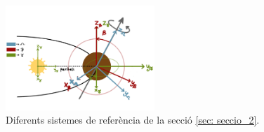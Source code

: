 \documentclass[11pt]{article}
\begin{document}
\begin{figure}[hbt]
    \centering
    \includegraphics[width=0.5\textwidth]{sist_ref.PNG}
    \caption{Diferents sistemes de referència de la secció \ref{sec: seccio_2}.}
    \label{fig: sist_ref}
\end{figure}
\end{document}
